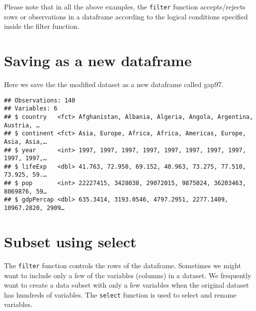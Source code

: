 \documentclass[]{book}
\newenvironment{Shaded}{\begin{snugshade}}{\end{snugshade}}
\newcommand{\KeywordTok}[1]{\textcolor[rgb]{0.13,0.29,0.53}{\textbf{#1}}}
\newcommand{\DataTypeTok}[1]{\textcolor[rgb]{0.13,0.29,0.53}{#1}}
\newcommand{\DecValTok}[1]{\textcolor[rgb]{0.00,0.00,0.81}{#1}}
\newcommand{\StringTok}[1]{\textcolor[rgb]{0.31,0.60,0.02}{#1}}
\newcommand{\CommentTok}[1]{\textcolor[rgb]{0.56,0.35,0.01}{\textit{#1}}}
\newcommand{\OperatorTok}[1]{\textcolor[rgb]{0.81,0.36,0.00}{\textbf{#1}}}
\newcommand{\NormalTok}[1]{#1}
\begin{document}
Please note that in all the above examples, the \texttt{filter} function
accepts/rejects rows or observations in a dataframe according to the
logical conditions specified inside the filter function.

\section{Saving as a new dataframe}\label{saving-as-a-new-dataframe}

Here we save the the modified dataset as a new dataframe called gap97.

\begin{Shaded}
\end{Shaded}

\begin{verbatim}
## Observations: 140
## Variables: 6
## $ country   <fct> Afghanistan, Albania, Algeria, Angola, Argentina, Austria, …
## $ continent <fct> Asia, Europe, Africa, Africa, Americas, Europe, Asia, Asia,…
## $ year      <int> 1997, 1997, 1997, 1997, 1997, 1997, 1997, 1997, 1997, 1997,…
## $ lifeExp   <dbl> 41.763, 72.950, 69.152, 40.963, 73.275, 77.510, 73.925, 59.…
## $ pop       <int> 22227415, 3428038, 29072015, 9875024, 36203463, 8069876, 59…
## $ gdpPercap <dbl> 635.3414, 3193.0546, 4797.2951, 2277.1409, 10967.2820, 2909…
\end{verbatim}

\section{Subset using select}\label{subset-using-select}

The \texttt{filter} function controls the rows of the dataframe.
Sometimes we might want to include only a few of the variables (columns)
in a dataset. We frequently want to create a data subset with only a few
variables when the original dataset has hundreds of variables. The
\texttt{select} function is used to select and rename variables.

\begin{Shaded}
\end{Shaded}
\end{document}
